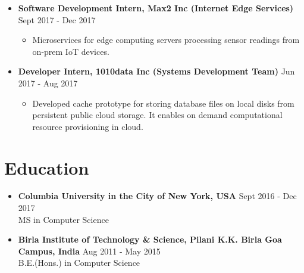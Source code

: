 \documentclass{article}
\newcommand{\bi}{\vspace{-1mm}\begin{itemize}[align=left,leftmargin=*, rightmargin=80pt, labelindent=0pt,labelsep=2pt, label={-}, nosep]}
\newcommand{\ei}{\end{itemize}}
\begin{document}
\begin{itemize}
    \item \textbf{Software Development Intern, Max2 Inc (Internet Edge Services)} {\hfill Sept 2017 - Dec 2017}
    \bi
        \item Microservices for edge computing servers processing sensor readings from on-prem IoT devices.
    \ei

    \item \textbf{Developer Intern, 1010data Inc (Systems Development Team)} {\hfill Jun 2017 - Aug 2017}
    \bi
        \item Developed cache prototype for storing database files on local disks from persistent public cloud storage. It enables on demand computational resource provisioning in cloud.
    \ei
\end{itemize}

\vspace{-2mm}
\section*{Education}
\begin{itemize}
    \item \textbf{Columbia University in the City of New York, USA} {\hfill Sept 2016 - Dec 2017}\\
    MS in Computer Science
    
    \item \textbf{Birla Institute of Technology \& Science, Pilani K.K. Birla Goa Campus, India} {\hfill Aug 2011 - May 2015}\\
    B.E.(Hons.) in Computer Science
\end{itemize}


\vspace{-2mm}
\end{document}
